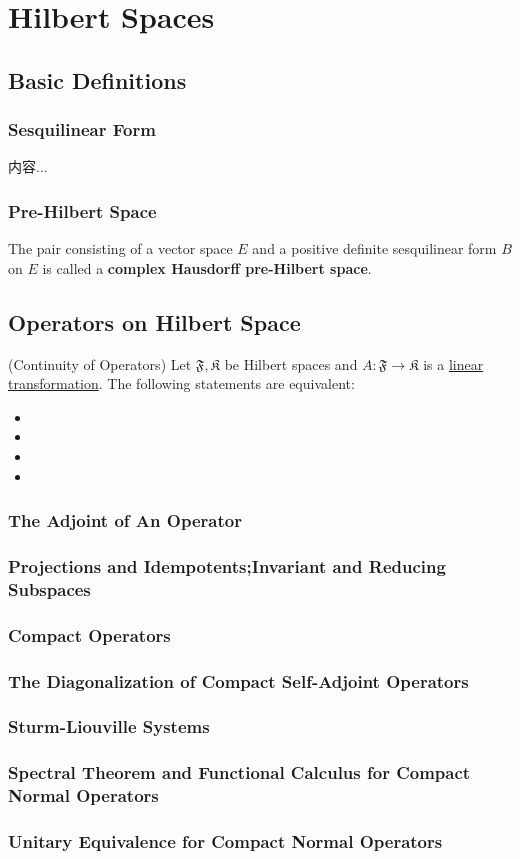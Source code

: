 \documentclass[Total.tex]{subfiles}
\begin{document}
	\chapter{Hilbert Spaces}
		\section{Basic Definitions}
			\subsection{Sesquilinear Form}
				\begin{Def}
					内容...
				\end{Def}
			\subsection{Pre-Hilbert Space}
				\begin{Def}
					The pair consisting of a vector space $E$ and a positive definite sesquilinear form $B$ on $E$ is called a \textbf{complex Hausdorff pre-Hilbert space}.
				\end{Def}
		\section{Operators on Hilbert Space}
			\begin{proposition}
				(Continuity of Operators) Let $\mathfrak{F},\mathfrak{K}$ be Hilbert spaces and $A:\mathfrak{F}\rightarrow \mathfrak{K}$ is a \underline{linear transformation}. The following statements are equivalent:
				\begin{itemize}
					\item 
					\item 
					\item 
					\item 
				\end{itemize}
			\end{proposition}
			\subsection{The Adjoint of An Operator}
			\subsection{Projections and Idempotents;Invariant and Reducing Subspaces}
			\subsection{Compact Operators}
			\subsection{The Diagonalization of Compact Self-Adjoint Operators}
			\subsection{Sturm-Liouville Systems}
			\subsection{Spectral Theorem and Functional Calculus for Compact Normal Operators}
			\subsection{Unitary Equivalence for Compact Normal Operators}
\end{document}
